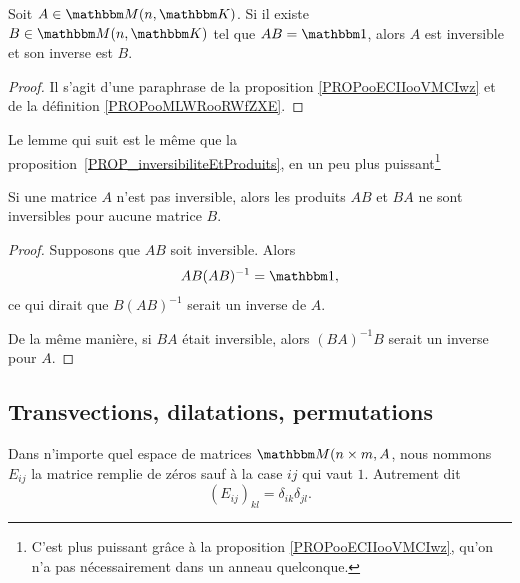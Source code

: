 \begin{corollary}       \label{CORooBQLXooTeVfgb}
    Soit \( A\in \eM(n,\eK)\). Si il existe \( B\in \eM(n,\eK)\) tel que \( AB=\mtu\), alors \( A\) est inversible et son inverse est \( B\).
\end{corollary}

\begin{proof}
    Il s'agit d'une paraphrase de la proposition \ref{PROPooECIIooVMCIwz} et de la définition \ref{PROPooMLWRooRWfZXE}.
\end{proof}

Le lemme qui suit est le même que la proposition~\ref{PROP_inversibiliteEtProduits}, en un peu plus puissant\footnote{C'est plus puissant grâce à la proposition \ref{PROPooECIIooVMCIwz}, qu'on n'a pas nécessairement dans un anneau quelconque.}

\begin{lemma}       \label{LEMooZDNVooArIXzC}
    Si une matrice \( A\) n'est pas inversible, alors les produits \( AB\) et \( BA \) ne sont inversibles pour aucune matrice \( B\).
\end{lemma}

\begin{proof}
    Supposons que \( AB\) soit inversible. Alors
    \begin{equation}
        AB(AB)^{-1}=\mtu,
    \end{equation}
    ce qui dirait que \( B(AB)^{-1}\) serait un inverse de \( A\).
    
    De la même manière, si \( BA \) était inversible, alors \( (BA)^{-1}B \) serait un inverse pour \( A \).
\end{proof}
\subsection{Transvections, dilatations, permutations}

Dans n'importe quel espace de matrices \( \eM(n \times m, A \), nous nommons \( E_{ij}\) la matrice remplie de zéros sauf à la case \( ij\) qui vaut \( 1\). Autrement dit
\begin{equation}
    (E_{ij})_{kl}=\delta_{ik}\delta_{jl}.
\end{equation}

